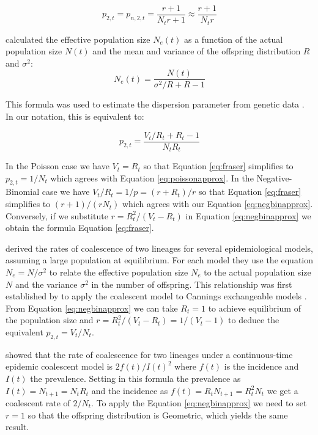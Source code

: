 \documentclass{article}
\renewcommand{\eqref}[1]{\ref{#1}}
\begin{document}
\begin{equation}
p_{2,t}=p_{n,2,t}=\frac{r+1}{N_t r +1} \approx \frac{r+1}{N_t r}\label{eq:negbinapprox}
\end{equation}

\citet{Fraser2017} calculated the effective population size $N_e(t)$ 
as a function of the actual population size $N(t)$ and the mean and variance of the offspring distribution $R$ and $\sigma^2$:
\begin{equation}
N_e(t)=\frac{N(t)}{\sigma^2/R+R-1}
\end{equation}

This formula was used to estimate the dispersion parameter from genetic data \citep{Li2017}.
In our notation, this is equivalent to:

\begin{equation}
 p_{2,t}=\frac{V_t/R_t+R_t-1}{N_t R_t}\label{eq:fraser}
 \end{equation}

In the Poisson case we have $V_t=R_t$ so that Equation \eqref{eq:fraser} simplifies to $p_{2,t}=1/N_t$ which agrees with Equation \eqref{eq:poissonapprox}. 
In the Negative-Binomial case we have $V_t/R_t=1/p=(r+R_t)/r$ so that Equation \eqref{eq:fraser}
simplifies to $(r+1)/(rN_t)$ which agrees with our Equation \eqref{eq:negbinapprox}. 
Conversely, if we substitute $r=R_t^2/(V_t-R_t)$
in Equation \eqref{eq:negbinapprox} we obtain the formula Equation \eqref{eq:fraser}.

\citet{koelleRatesCoalescenceCommon2012} derived the rates of coalescence of two lineages 
for several epidemiological models, assuming a large population at equilibrium.
For each model they use the equation $N_e=N/\sigma^2$ to relate the effective population
size $N_e$ to the actual population size $N$ and the variance $\sigma^2$ in the number
of offspring. This relationship was first established by \citet{Kingman1982} to
apply the coalescent model to Cannings exchangeable models \citep{Cannings1974}. 
From Equation \eqref{eq:negbinapprox} we can take $R_t=1$ to achieve 
equilibrium of the population size and $r=R_t^2/(V_t-R_t)=1/(V_t-1)$ to deduce 
the equivalent $p_{2,t}=V_t/N_t$. 

\citet{Volz2012a} showed that the rate of coalescence for two lineages under a continuous-time epidemic coalescent model is $2f(t)/I(t)^2$
 where $f(t)$ is the incidence and $I(t)$ the prevalence. 
 Setting in this formula the prevalence as $I(t)=N_{t+1}=N_t R_t$ and the incidence as
 $f(t)=R_t N_{t+1}=R_t^2 N_t$ we get a coalescent rate of 
 $2/N_t$. To apply the Equation \eqref{eq:negbinapprox} we need to set $r=1$ 
 so that the offspring distribution is Geometric, which yields the same result.
\end{document}

